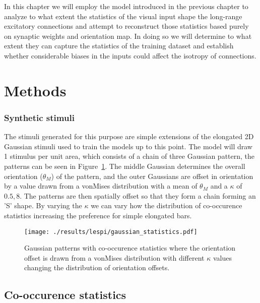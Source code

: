 In this chapter we will employ the model introduced in the previous
chapter to analyze to what extent the statistics of the visual input
shape the long-range excitatory connections and attempt to reconstruct
those statistics based purely on synaptic weights and orientation
map. In doing so we will determine to what extent they can capture the
statistics of the training dataset and establish whether considerable
biases in the inputs could affect the isotropy of connections.

\section{Methods}

\subsubsection{Synthetic stimuli} \label{synthetic}

The stimuli generated for this purpose are simple extensions of the
elongated 2D Gaussian stimuli used to train the models up to this
point. The model will draw 1 stimulus per unit area, which consists of
a chain of three Gaussian pattern, the patterns can be seen in
Figure~\ref{GaussianStatistics}. The middle Gaussian determines the
overall orientation ($\theta_M$) of the pattern, and the outer
Gaussians are offset in orientation by a value drawn from a vonMises
distribution with a mean of $\theta_M$ and a $\kappa$ of ${0.5,
  8}$. The patterns are then spatially offset so that they form a
chain forming an 'S' shape. By varying the $\kappa$ we can vary how
the distribution of co-occurence statistics increasing the preference
for simple elongated bars.

\begin{figure}
	\centering
	\texttt{[image: ./results/lespi/gaussian\_statistics.pdf]}
	\caption[Example of Gaussian patterns with co-occurence
      statistics] {Gaussian patterns with co-occurence statistics
      where the orientation offset is drawn from a vonMises
      distribution with different $\kappa$ values changing the
      distribution of orientation offsets.}
    \label{GaussianStatistics}
\end{figure}

\subsection{Co-occurence statistics}

